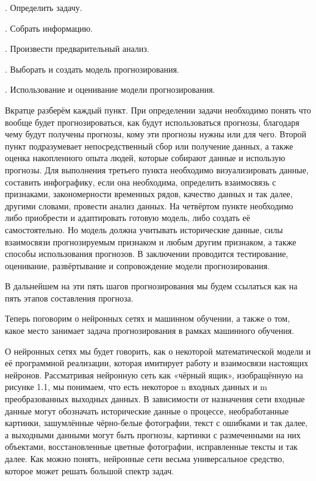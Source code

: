 {  \par {}. Определить задачу. 
  \par {}. Собрать информацию. 
  \par {}. Произвести предварительный анализ.
  \par {}. Выборать и создать модель прогнозирования.
  \par {}. Использование и оценивание модели прогнозирования. 

  \par \redline Вкратце разберём каждый пункт. При определении задачи необходимо понять что вообще будет прогнозироваться, как будут использоваться прогнозы, благодаря чему будут получены прогнозы, кому эти прогнозы нужны или для чего. Второй пункт подразумевает непосредственный сбор или получение данных, а также оценка накопленного опыта людей, которые собирают данные и использую прогнозы. Для выполнения третьего пункта необходимо визуализировать данные, составить инфографику, если она необходима, определить взаимосвязь с признаками, закономерности временных рядов, качество данных и так далее, другими словами, провести анализ данных. На четвёртом пункте необходимо либо приобрести и адаптировать готовую модель, либо создать её самостоятельно. Но модель должна учитывать исторические данные, силы взаимосвязи прогнозируемым признаком и любым другим признаком, а также способы использования прогнозов. В заключении проводится тестирование, оценивание, развёртывание и сопровождение модели прогнозирования. 

  \par \redline В дальнейшем на эти пять шагов прогнозирования мы будем ссылаться как на пять этапов составления прогноза.

  \par \redline Теперь поговорим о нейронных сетях и машинном обучении, а также о том, какое место занимает задача прогнозирования в рамках машинного обучения. 

  \par \redline О нейронных сетях мы будет говорить, как о некоторой математической модели и её программной реализации, которая имитирует работу и взаимосвязи настоящих нейронов.  Рассматривая нейронную сеть как «чёрный ящик», изобращённую на рисунке 1.1, мы понимаем, что есть некоторое n входных данных и m преобразованных выходных данных. В зависимости от назначения сети входные данные могут обозначать исторические данные о процессе, необработанные картинки, зашумлённые чёрно-белые фотографии, текст с ошибками и так далее, а выходными данными могут быть прогнозы, картинки с размеченными на них объектами, восстановленные цветные фотографии, исправленные тексты и так далее. Как можно понять, нейронные сети весьма универсальное средство, которое может решать большой спектр задач. 

}
